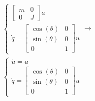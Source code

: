 \begin{gather*}
\begin{cases}
        \begin{bmatrix}
            m & 0\\
            0 & J
        \end{bmatrix}a \\
        \dot{q} = 
        \begin{bmatrix}
            \cos(\theta) & 0\\
            \sin(\theta) & 0\\
            0 & 1
        \end{bmatrix}u
    \end{cases} \rightarrow \\
    \begin{cases}
        \dot{u} = a \\
        \dot{q} =
        \begin{bmatrix}
            \cos(\theta) & 0\\
            \sin(\theta) & 0\\
            0 & 1
        \end{bmatrix}u
    \end{cases}
\end{gather*}
